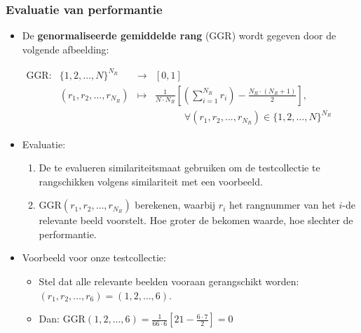 \documentclass[dutch]{beamer}
\theoremstyle{definition}
\theoremstyle{remark}
\theoremstyle{example}
\begin{document}
{
  \frametitle{Evaluatie van performantie}

  \begin{itemize}
  \item De \textbf{genormaliseerde gemiddelde rang} (GGR) wordt gegeven door de volgende afbeelding:
  \begin{minipage}{\textwidth}
  \vspace{3pt}
  \centering
  \scriptsize$\begin{array}{lrcl}
  \text{GGR}: & \{1,2,\ldots,N\}^{N_R} & \to 	& [0,1] \\
		& (r_1,r_2,\ldots,r_{N_R}) & \mapsto &
	{\displaystyle\frac{1}{N \cdot N_R}\left[ \left(\sum_{i=1}^{N_R}r_i\right) - \frac{N_R \cdot (N_R + 1)}{2} \right]},\\[15pt]
	& & & \qquad \quad \forall (r_1, r_2, ..., r_{N_R}) \in \{1,2,\ldots,N\}^{N_R}
  \end{array}$
  \end{minipage}
  \item Evaluatie:
  \begin{enumerate}
    \item De te evalueren similariteitsmaat gebruiken om de testcollectie te rangschikken 
    volgens similariteit met een voorbeeld. 
    \item $\text{GGR}(r_1,r_2,\ldots,r_{N_R})$ berekenen, waarbij $r_i$ het rangnummer 
    van het $i$-de relevante beeld voorstelt. Hoe groter de bekomen waarde, hoe 
    slechter de performantie.
  \end{enumerate}
  \item Voorbeeld voor onze testcollectie:
  \begin{itemize}
    \item Stel dat alle relevante beelden vooraan gerangschikt worden: 
    $(r_1,r_2,\ldots,r_6) = (1,2,\ldots,6)$.
    \item Dan: $\text{GGR}(1,2,\ldots,6)=\frac{1}{66 \cdot 6} \left[21 - \frac{6 \cdot 7}{2}\right]=0$
  \end{itemize}
  \end{itemize}
}
\frame
\end{document}

